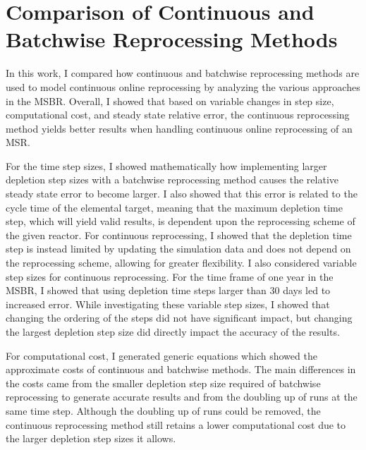 \renewcommand*\descriptionlabel[1]{\hspace\leftmargin$#1$}
\setcounter{tocdepth}{5}
\setcounter{secnumdepth}{5}


\section{Comparison of Continuous and Batchwise Reprocessing Methods}

In this work, I compared how continuous and batchwise reprocessing methods are used to model continuous online reprocessing by analyzing the various approaches in the MSBR.
Overall, I showed that based on variable changes in step size, computational cost, and steady state relative error, the continuous reprocessing method yields better results when handling continuous online reprocessing of an MSR.

For the time step sizes, I showed mathematically how implementing larger depletion step sizes with a batchwise reprocessing method causes the relative steady state error to become larger.
I also showed that this error is related to the cycle time of the elemental target, meaning that the maximum depletion time step, which will yield valid results, is dependent upon the reprocessing scheme of the given reactor.
For continuous reprocessing, I showed that the depletion time step is instead limited by updating the simulation data and does not depend on the reprocessing scheme, allowing for greater flexibility.
I also considered variable step sizes for continuous reprocessing.
For the time frame of one year in the MSBR, I showed that using depletion time steps larger than 30 days led to increased error.
While investigating these variable step sizes, I showed that changing the ordering of the steps did not have significant impact, but changing the largest depletion step size did directly impact the accuracy of the results.

For computational cost, I generated generic equations which showed the approximate costs of continuous and batchwise methods. The main differences in the costs came from the smaller depletion step size required of batchwise reprocessing to generate accurate results and from the doubling up of runs at the same time step.
Although the doubling up of runs could be removed, the continuous reprocessing method still retains a lower computational cost due to the larger depletion step sizes it allows.

